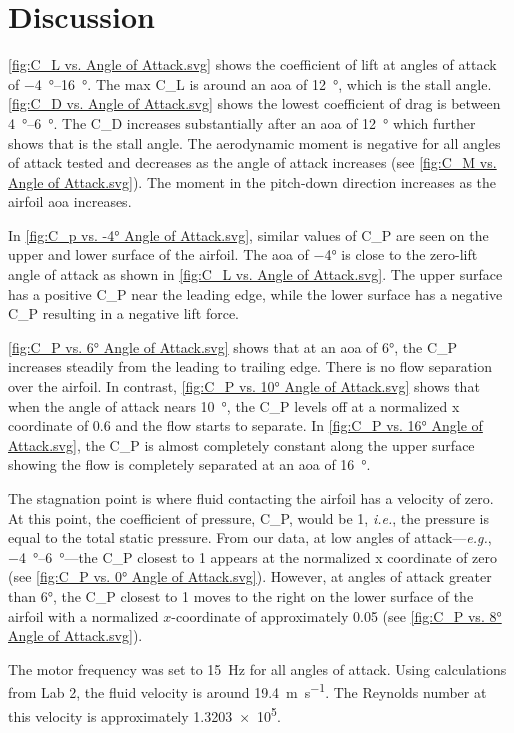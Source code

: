 \chapter{Discussion}
\label{cp:discussion}

\autoref{fig:C_L vs. Angle of Attack.svg} shows the coefficient of lift at angles of attack of \qtyrange{-4}{16}{\degree}. The max \gls{C_L} is around an \acrshort{aoa} of \qty{12}{\degree}, which is the stall angle. \autoref{fig:C_D vs. Angle of Attack.svg} shows the lowest coefficient of drag is between \qtyrange{4}{6}{\degree}. The \gls{C_D} increases substantially after an \acrshort{aoa} of \qty{12}{\degree} which further shows that is the stall angle. The aerodynamic moment is negative for all angles of attack tested and decreases as the angle of attack increases (see \autoref{fig:C_M vs. Angle of Attack.svg}). The moment in the pitch-down direction increases as the airfoil \acrshort{aoa} increases. 

In \autoref{fig:C_p vs. -4° Angle of Attack.svg}, similar values of \gls{C_P} are seen on the upper and lower surface of the airfoil. The \acrshort{aoa} of \num{-4}\unit{\degree} is close to the zero-lift angle of attack as shown in \autoref{fig:C_L vs. Angle of Attack.svg}. The upper surface has a positive \gls{C_P} near the leading edge, while the lower surface has a negative \gls{C_P} resulting in a negative lift force.

\autoref{fig:C_P vs. 6° Angle of Attack.svg} shows that at an \acrshort{aoa} of \num{6}\unit{\degree}, the \gls{C_P} increases steadily from the leading to trailing edge. There is no flow separation over the airfoil. In contrast, \autoref{fig:C_P vs. 10° Angle of Attack.svg} shows that when the angle of attack nears \qty{10}{\degree}, the \gls{C_P} levels off at a normalized x coordinate of \num{0.6} and the flow starts to separate. In \autoref{fig:C_P vs. 16° Angle of Attack.svg}, the \gls{C_P} is almost completely constant along the upper surface showing the flow is completely separated at an \acrshort{aoa} of \qty{16}{\degree}.

The stagnation point is where fluid contacting the airfoil has a velocity of zero. At this point, the coefficient of pressure, \gls{C_P}, would be \num{1}, \textit{i.e.}, the pressure is equal to the total static pressure. From our data, at low angles of attack—\textit{e.g.}, \qtyrange{-4}{6}{\degree}—the \gls{C_P} closest to \num{1} appears at the normalized x coordinate of zero (see \autoref{fig:C_P vs. 0° Angle of Attack.svg}). However, at angles of attack greater than \num{6}\unit{\degree}, the \gls{C_P} closest to \num{1} moves to the right on the lower surface of the airfoil with a normalized $x$-coordinate of approximately \num{0.05} (see \autoref{fig:C_P vs. 8° Angle of Attack.svg}).

The motor frequency was set to \qty{15}{\hertz} for all angles of attack. Using calculations from Lab 2, the fluid velocity is around \qty{19.4}{\meter\per\second}. The Reynolds number at this velocity is approximately \num{1.3203e5}.